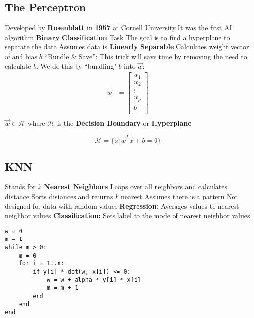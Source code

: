 \subsection{The Perceptron\cite{rosenblatt1958perceptron}}
\begin{outline}
    \1 Developed by \textbf{Rosenblatt} in \textbf{1957} at Cornell University
    \1 It was the first AI algorithm
    \1 \textbf{Binary Classification} Task
    \1 The goal is to find a hyperplane to separate the data
    \1 Assumes data is \textbf{Linearly Separable}
    \1 Calculates weight vector $\vec{w}$ and bias $b$ 
    \1 ``Bundle \& Save'': This trick will save time by removing the need to calculate $b$. We do this by ``bundling" $b$ into $\vec{w}$: 
    \begin{align*}
    \vec{w} &= \begin{bmatrix}
           w_{1}    \\
           w_{2}    \\
           \vdots   \\
           w_{p}    \\
           b        \\
         \end{bmatrix} \\
    \end{align*}
    \1 $\vec{w} \in \mathcal{H}$ where $\mathcal{H}$ is the \textbf{Decision Boundary} or \textbf{Hyperplane}
\end{outline}

\[
\mathcal{H} = \{\vec{x} | \vec{w}^T\vec{x} + b = 0\}
\]

\subsection{KNN\cite{guo2003knn}}
\begin{outline}
    \1 Stands for \textbf{$k$ Nearest Neighbors}
    \1 Loops over all neighbors and calculates distance
    \1 Sorts distances and returns $k$ nearest
    \1 Assumes there is a pattern
    \1 Not designed for data with random values
    \1 \textbf{Regression:} Averages values to nearest neighbor values
    \1 \textbf{Classification:} Sets label to the mode of nearest neighbor values
\end{outline}

\begin{verbatim}
w = 0
m = 1
while m > 0:
    m = 0
    for i = 1..n:
        if y[i] * dot(w, x[i]) <= 0:
            w = w + alpha * y[i] * x[i]
            m = m + 1
        end
    end
end
\end{verbatim}

